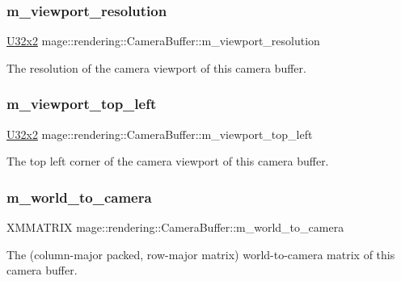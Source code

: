\subsubsection{\texorpdfstring{m\+\_\+viewport\+\_\+resolution}{m\_viewport\_resolution}}
{\footnotesize\ttfamily \hyperlink{namespacemage_a88e05bff0300120c013285d3dcad95c5}{U32x2} mage\+::rendering\+::\+Camera\+Buffer\+::m\+\_\+viewport\+\_\+resolution}

The resolution of the camera viewport of this camera buffer. \hypertarget{structmage_1_1rendering_1_1_camera_buffer_a6b0e644fb4e7dfd2f55ac4f447cddfac}{}\label{structmage_1_1rendering_1_1_camera_buffer_a6b0e644fb4e7dfd2f55ac4f447cddfac} 
\subsubsection{\texorpdfstring{m\+\_\+viewport\+\_\+top\+\_\+left}{m\_viewport\_top\_left}}
{\footnotesize\ttfamily \hyperlink{namespacemage_a88e05bff0300120c013285d3dcad95c5}{U32x2} mage\+::rendering\+::\+Camera\+Buffer\+::m\+\_\+viewport\+\_\+top\+\_\+left}

The top left corner of the camera viewport of this camera buffer. \hypertarget{structmage_1_1rendering_1_1_camera_buffer_af1ceff883dcc383ce10f2165a5a9a061}{}\label{structmage_1_1rendering_1_1_camera_buffer_af1ceff883dcc383ce10f2165a5a9a061} 
\subsubsection{\texorpdfstring{m\+\_\+world\+\_\+to\+\_\+camera}{m\_world\_to\_camera}}
{\footnotesize\ttfamily X\+M\+M\+A\+T\+R\+IX mage\+::rendering\+::\+Camera\+Buffer\+::m\+\_\+world\+\_\+to\+\_\+camera}

The (column-\/major packed, row-\/major matrix) world-\/to-\/camera matrix of this camera buffer. 